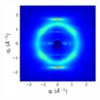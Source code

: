 \documentclass[journal=jpcbfk,manusciprt=article]{achemso}
\begin{document}
\begin{figure}[htb]
\begin{subfigure}{0.88\textwidth}
\begin{subfigure}{0.28\linewidth}
\begin{subfigure}{\textwidth}
			\end{subfigure}
	\end{subfigure}
	\begin{subfigure}{0.4\linewidth}
	\centering
			\begin{subfigure}{\textwidth}
		       		\centering
	        		\includegraphics[width=\linewidth]{WAXS_raw_jet_nocbar.png}
			\end{subfigure}
	\end{subfigure}
	\begin{subfigure}{0.28\linewidth}
	\centering
			\begin{subfigure}{\textwidth}
			\centering

\end{subfigure}
\end{subfigure}
\end{subfigure}
\end{figure}
\end{document}
